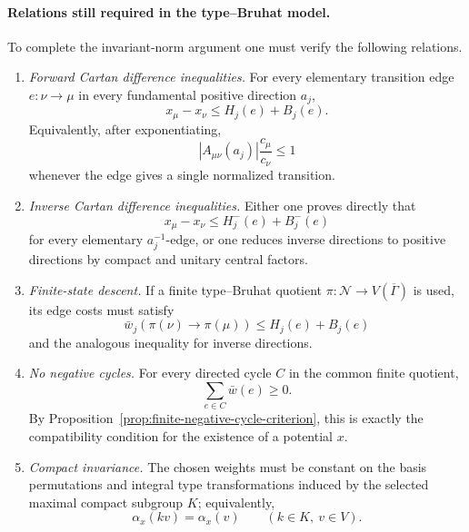 \documentclass[12pt]{article}
\theoremstyle{definition}
\theoremstyle{remark}
\begin{document}
\paragraph{Relations still required in the type--Bruhat model.}
To complete the invariant-norm argument one must verify the following
relations.

\begin{enumerate}
 \item \emph{Forward Cartan difference inequalities.}
 For every elementary transition edge
 \(e:\nu\to\mu\) in every fundamental positive direction \(a_j\),
 \begin{equation}\label{eq:required-forward-difference-inequality}
  x_\mu-x_\nu
  \leq
  H_j(e)+B_j(e).
 \end{equation}
 Equivalently, after exponentiating,
 \[
  |A_{\mu\nu}(a_j)|\frac{c_\mu}{c_\nu}\leq1
 \]
 whenever the edge gives a single normalized transition.

 \item \emph{Inverse Cartan difference inequalities.}
 Either one proves directly that
 \begin{equation}\label{eq:required-inverse-difference-inequality}
  x_\mu-x_\nu
  \leq
  H_j^-(e)+B_j^-(e)
 \end{equation}
 for every elementary \(a_j^{-1}\)-edge, or one reduces inverse directions
 to positive directions by compact and unitary central factors.

 \item \emph{Finite-state descent.}
 If a finite type--Bruhat quotient
 \(\pi:\mathscr N\to V(\overline\Gamma)\) is used, its edge costs must satisfy
 \begin{equation}\label{eq:required-finite-state-lower-bound-section8}
  \bar w_j(\pi(\nu)\to\pi(\mu))
  \leq
  H_j(e)+B_j(e)
 \end{equation}
 and the analogous inequality for inverse directions.

 \item \emph{No negative cycles.}
 For every directed cycle \(C\) in the common finite quotient,
 \begin{equation}\label{eq:required-cycle-inequality-section8}
  \sum_{e\in C}\bar w(e)\geq0.
 \end{equation}
 By Proposition~\ref{prop:finite-negative-cycle-criterion}, this is exactly
 the compatibility condition for the existence of a potential \(x\).

 \item \emph{Compact invariance.}
 The chosen weights must be constant on the basis permutations and integral
 type transformations induced by the selected maximal compact subgroup
 \(K\); equivalently,
 \begin{equation}\label{eq:required-K-invariance-section8}
  \alpha_x(kv)=\alpha_x(v)
  \qquad(k\in K,\ v\in V).
 \end{equation}


\end{enumerate}
\end{document}
